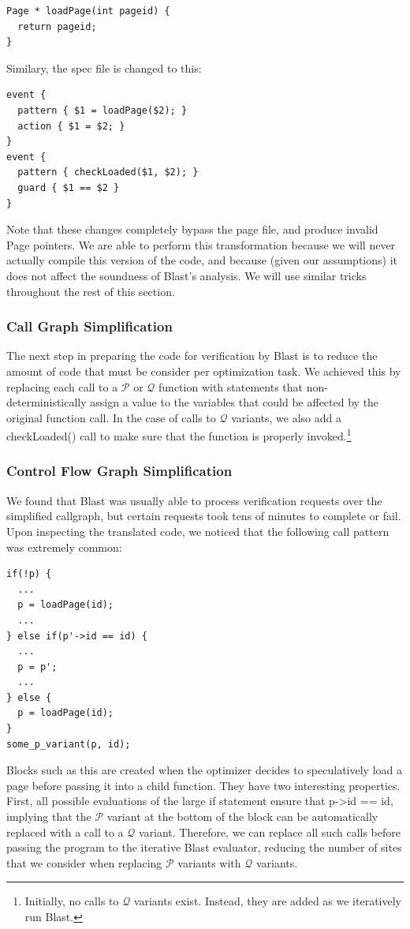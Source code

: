 \documentclass[10pt,letterpaper,twocolumn,english]{article}
\newcommand{\checkpage}{checkLoaded()\xspace}
\newcommand{\fP}{{$\mathcal P$}\xspace}
\newcommand{\fQ}{{$\mathcal Q$}\xspace}
\begin{document}
\begin{verbatim}
Page * loadPage(int pageid) {
  return pageid;
}
\end{verbatim}
Similary, the spec file is changed to this:
\begin{verbatim}
event { 
  pattern { $1 = loadPage($2); }
  action { $1 = $2; }
}
event { 
  pattern { checkLoaded($1, $2); }  
  guard { $1 == $2 }
}
\end{verbatim}

Note that these changes completely bypass the page file, and produce invalid Page pointers.
We are able to perform this transformation because we will never
actually compile this version of the code, and because (given our
assumptions) it does not affect the soundness of Blast's analysis.  We
will use similar tricks throughout the rest of this section.

\subsubsection{Call Graph Simplification}

The next step in preparing the code for verification by Blast is to
reduce the amount of code that must be consider per optimization task.
We achieved this by replacing each call to a \fP or \fQ function with
statements that non-deterministically assign a value to the variables
that could be affected by the original function call.  In the case of
calls to \fQ variants, we also add a \checkpage call to make sure that
the function is properly invoked.\footnote{Initially, no calls to \fQ
variants exist.  Instead, they are added as we iteratively run Blast.}

\subsubsection{Control Flow Graph Simplification}

We found that Blast was usually able to process verification requests
over the simplified callgraph, but certain requests took tens of
minutes to complete or fail.  Upon inspecting the translated code, we
noticed that the following call pattern was extremely common:

\begin{verbatim}
if(!p) { 
  ...
  p = loadPage(id);
  ...
} else if(p'->id == id) {
  ...
  p = p';
  ...
} else {
  p = loadPage(id);
}
some_p_variant(p, id);
\end{verbatim}

Blocks such as this are created when the optimizer decides to
speculatively load a page before passing it into a child function.
They have two interesting properties.  First, all possible evaluations
of the large if statement ensure that p->id == id, implying that the
\fP variant at the bottom of the block can be automatically replaced
with a call to a \fQ variant.  Therefore, we can replace all such calls
before passing the program to the iterative Blast evaluator, reducing
the number of sites that we consider when replacing \fP variants with
\fQ variants.
\end{document}
